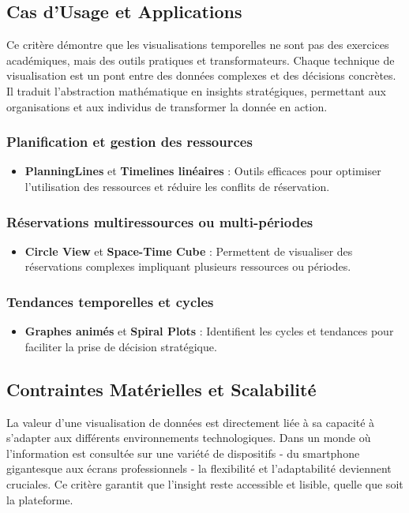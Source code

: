 \documentclass[runningheads]{llncs}
\begin{document}
\subsection{Cas d’Usage et Applications}
Ce critère démontre que les visualisations temporelles ne sont pas des exercices académiques, mais des outils pratiques et transformateurs. Chaque technique de visualisation est un pont entre des données complexes et des décisions concrètes. Il traduit l'abstraction mathématique en insights stratégiques, permettant aux organisations et aux individus de transformer la donnée en action.

\subsubsection{Planification et gestion des ressources}
\begin{itemize}
    \item \textbf{PlanningLines} et \textbf{Timelines linéaires} : Outils efficaces pour optimiser l'utilisation des ressources et réduire les conflits de réservation.
\end{itemize}

\subsubsection{Réservations multiressources ou multi-périodes}
\begin{itemize}
    \item \textbf{Circle View} et \textbf{Space-Time Cube} : Permettent de visualiser des réservations complexes impliquant plusieurs ressources ou périodes.
\end{itemize}

\subsubsection{Tendances temporelles et cycles}
\begin{itemize}
    \item \textbf{Graphes animés} et \textbf{Spiral Plots} : Identifient les cycles et tendances pour faciliter la prise de décision stratégique.
\end{itemize}

\subsection{Contraintes Matérielles et Scalabilité}
La valeur d'une visualisation de données est directement liée à sa capacité à s'adapter aux différents environnements technologiques. Dans un monde où l'information est consultée sur une variété de dispositifs - du smartphone gigantesque aux écrans professionnels - la flexibilité et l'adaptabilité deviennent cruciales. Ce critère garantit que l'insight reste accessible et lisible, quelle que soit la plateforme.
\end{document}
